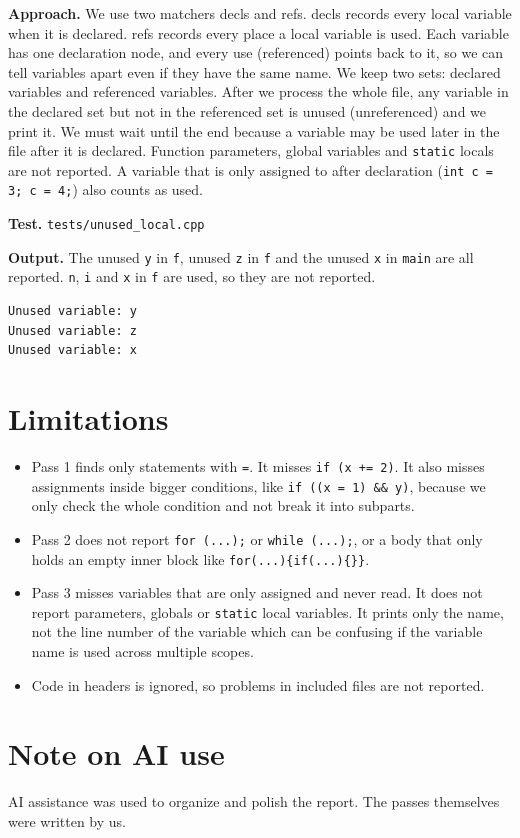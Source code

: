 \documentclass[11pt,a4paper]{article}
\begin{document}
\textbf{Approach.} We use two matchers decls and refs. decls records every local variable when it is declared. refs records every place a local variable is used. Each variable has one declaration node, and every use (referenced) points back to it, so we can tell variables apart even if they have the same name. We keep two sets: declared variables and referenced variables. After we process the whole file, any variable in the declared set but not in the referenced set is unused (unreferenced) and we print it. We must wait until the end because a variable may be used later in the file after it is declared. Function parameters, global variables and \texttt{static} locals are not reported. A variable that is only assigned to after declaration (\texttt{int c = 3; c = 4;}) also counts as used.

\textbf{Test.} \texttt{tests/unused\_local.cpp}

\textbf{Output.} The unused \texttt{y} in \texttt{f}, unused \texttt{z} in \texttt{f} and the unused \texttt{x} in \texttt{main} are all reported. \texttt{n}, \texttt{i} and \texttt{x} in \texttt{f} are used, so they are not reported.

\begin{Verbatim}[fontsize=\footnotesize,frame=single,breaklines=true]
Unused variable: y
Unused variable: z
Unused variable: x
\end{Verbatim}

\section{Limitations}
\begin{itemize}
\item Pass 1 finds only statements with \texttt{=}. It misses \texttt{if (x += 2)}. It also misses assignments inside bigger conditions, like \texttt{if ((x = 1) \&\& y)}, because we only check the whole condition and not break it into subparts.
\item Pass 2 does not report \texttt{for (...);} or \texttt{while (...);}, or a body that only holds an empty inner block like \texttt{for(...)\{if(...)\{\}\}}.
\item Pass 3 misses variables that are only assigned and never read. It does not report parameters, globals or \texttt{static} local variables. It prints only the name, not the line number of the variable which can be confusing if the variable name is used across multiple scopes.
\item Code in headers is ignored, so problems in included files are not reported.
\end{itemize}

\section*{Note on AI use}
AI assistance was used to organize and polish the report. The passes themselves were written by us.
\end{document}
